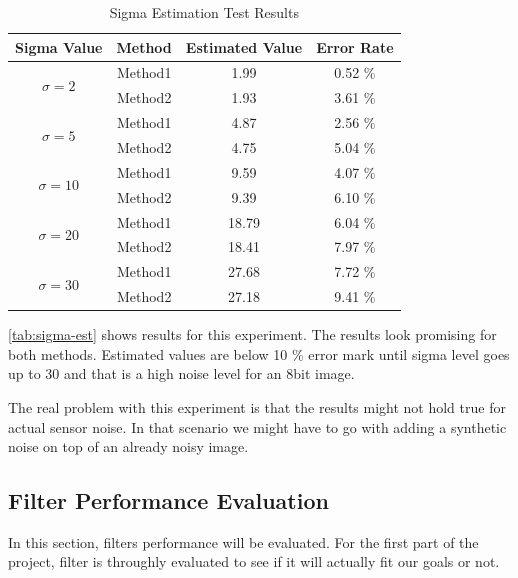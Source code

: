 \documentclass[10pt,twocolumn,letterpaper]{article}
\begin{document}
\begin{table}[h!]
	\centering
	\begin{tabular}{cccc}
		\toprule
		\bfseries Sigma Value & \bfseries Method & \bfseries Estimated Value & \bfseries Error Rate\\
		\midrule
		\multirow{2}{*}{\(\sigma=2\)} & Method1 & 1.99 & 0.52 \% \\
		& Method2 & 1.93 & 3.61 \% \\
		\multirow{2}{*}{\(\sigma=5\)} & Method1 & 4.87 & 2.56 \% \\
		& Method2 & 4.75 & 5.04 \% \\
		\multirow{2}{*}{\(\sigma=10\)} & Method1 & 9.59 & 4.07 \% \\
		& Method2 & 9.39 & 6.10 \% \\
		\multirow{2}{*}{\(\sigma=20\)} & Method1 & 18.79 & 6.04 \% \\
		& Method2 & 18.41 & 7.97 \% \\
		\multirow{2}{*}{\(\sigma=30\)} & Method1 & 27.68 & 7.72 \% \\
		& Method2 & 27.18 & 9.41 \% \\
		\bottomrule
	\end{tabular}
	\caption{Sigma Estimation Test Results}
	\label{tab:sigma-est}
\end{table}

\autoref{tab:sigma-est} shows results for this experiment. The results look promising for both methods. Estimated values are below 10 \% error mark until sigma level goes up to 30 and that is a high noise level for an 8bit image.

The real problem with this experiment is that the results might not hold true for actual sensor noise. In that scenario we might have to go with adding a synthetic noise on top of an already noisy image.

\subsection{Filter Performance Evaluation}
In this section, filters performance will be evaluated. For the first part of the project, filter is throughly evaluated to see if it will actually fit our goals or not.
{\small


}
\end{document}
